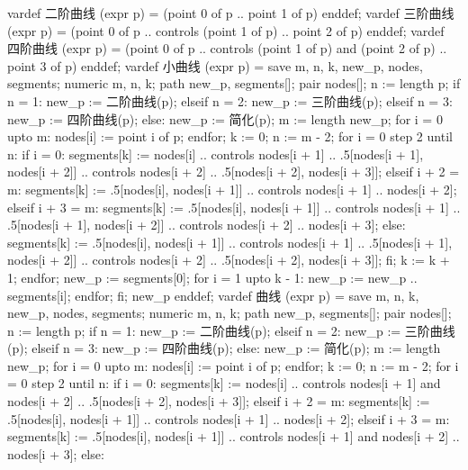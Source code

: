\startMPinclusions[+]
vardef 二阶曲线 (expr p) =
  (point 0 of p .. point 1 of p)
enddef;
vardef 三阶曲线 (expr p) =
  (point 0 of p .. controls (point 1 of p) .. point 2 of p)
enddef;
vardef 四阶曲线 (expr p) =
  (point 0 of p .. controls (point 1 of p) and (point 2 of p) .. point 3 of p)
enddef;
vardef 小曲线 (expr p) =
  save m, n, k, new_p, nodes, segments;
  numeric m, n, k; path new_p, segments[]; pair nodes[];
  n := length p;
  if n = 1:
    new_p := 二阶曲线(p);
  elseif n = 2:
    new_p := 三阶曲线(p);
  elseif n = 3:
    new_p := 四阶曲线(p);
  else:
    new_p := 简化(p);
    m := length new_p;
    for i = 0 upto m:
      nodes[i] := point i of p;
    endfor;
    k := 0;
    n := m - 2;
    for i = 0 step 2 until n:
      if i = 0:
        segments[k] := nodes[i] 
          .. controls nodes[i + 1]
          .. .5[nodes[i + 1], nodes[i + 2]]
          .. controls nodes[i + 2]
          .. .5[nodes[i + 2], nodes[i + 3]];
      elseif i + 2 = m:
        segments[k] := .5[nodes[i], nodes[i + 1]]
          .. controls nodes[i + 1]
          .. nodes[i + 2];
      elseif i + 3 = m:
        segments[k] := .5[nodes[i], nodes[i + 1]] 
          .. controls nodes[i + 1]
          .. .5[nodes[i + 1], nodes[i + 2]]
          .. controls nodes[i + 2]
          .. nodes[i + 3];
      else:
        segments[k] := .5[nodes[i], nodes[i + 1]] 
          .. controls nodes[i + 1]
          .. .5[nodes[i + 1], nodes[i + 2]]
          .. controls nodes[i + 2]
          .. .5[nodes[i + 2], nodes[i + 3]];
      fi;
      k := k + 1;
    endfor;
    new_p := segments[0];
    for i = 1 upto k - 1:
      new_p := new_p .. segments[i];
    endfor;
  fi;
  new_p
enddef;
vardef 曲线 (expr p) =
  save m, n, k, new_p, nodes, segments;
  numeric m, n, k; path new_p, segments[]; pair nodes[];
  n := length p;
  if n = 1:
    new_p := 二阶曲线(p);
  elseif n = 2:
    new_p := 三阶曲线(p);
  elseif n = 3:
    new_p := 四阶曲线(p);
  else:
    new_p := 简化(p);
    m := length new_p;
    for i = 0 upto m:
      nodes[i] := point i of p;
    endfor;
    k := 0;
    n := m - 2;
    for i = 0 step 2 until n:
      if i = 0:
        segments[k] := nodes[i] 
          .. controls nodes[i + 1] and nodes[i + 2] 
          .. .5[nodes[i + 2], nodes[i + 3]];
      elseif i + 2 = m:
        segments[k] := .5[nodes[i], nodes[i + 1]] 
          .. controls nodes[i + 1]
          .. nodes[i + 2];
      elseif i + 3 = m:
        segments[k] := .5[nodes[i], nodes[i + 1]] 
          .. controls nodes[i + 1] and nodes[i + 2] 
          .. nodes[i + 3];
      else:
